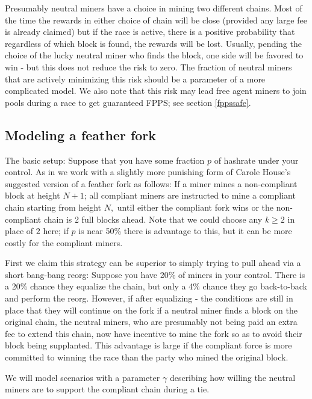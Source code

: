 \documentclass{article}%
\begin{document}
Presumably neutral miners have a choice in mining two different chains.
 Most of the time the rewards in either choice of chain will be close
(provided any large fee is already claimed) but if the race is active, there
is a positive probability that regardless of which block is found, the rewards
will be lost.  Usually, pending the choice of the lucky neutral miner who
finds the block, one side will be favored to win - but this does not reduce
the risk to zero. The fraction of neutral miners that are actively minimizing
this risk should be a parameter of a more complicated model. We also note that
this risk may lead free agent miners to join pools during a race to get
guaranteed FPPS; see section \ref{fppssafe}.

\subsection{Modeling a feather fork}

The basic setup:  Suppose that you have some fraction $p$ of hashrate under
your control.  As in \cite{Bonneau15} we work with a slightly more punishing
form of Carole House's suggested version of a feather fork \cite{House23} as
follows: If a miner mines a non-compliant block at height $N+1$; all compliant
miners are instructed to mine a compliant chain starting from height $N,$
until either the compliant fork wins or the non-compliant chain is 2 full
blocks ahead.  Note that we could choose any $k\geq2$ in place of $2$ here;
if $p$ is near 50\% there is advantage to this, but it can be more costly for
the compliant miners.

First we claim this strategy can be superior to simply trying to pull ahead
via a short bang-bang reorg: Suppose you have 20\% of miners in your control.
 There is a 20\% chance they equalize the chain, but only a 4\% chance they go
back-to-back and perform the reorg.  However, if after equalizing - the
conditions are still in place that they will continue on the fork if a neutral
miner finds a block on the original chain, the neutral miners, who are
presumably not being paid an extra fee to extend this chain, now have
incentive to mine the fork so as to avoid their block being supplanted.
 This advantage is large if the compliant force is more committed to
winning the race than the party who mined the original block.

We will model scenarios with a parameter $\gamma$ describing how willing the neutral miners
are to support the compliant chain during a tie.
\end{document}
